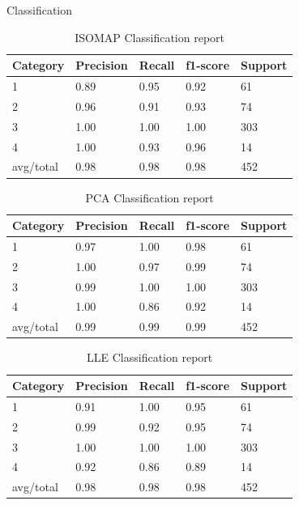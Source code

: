 \documentclass[final,hyperref={pdfpagelabels=false}]{beamer}
\begin{document}
\begin{frame}[t]
\begin{columns}[t]
\begin{column}{.465\textwidth}
\begin{block}{Classification}
\begin{table}
\begin{tabular}{l l l l l}
\toprule
\textbf{Category} & \textbf{Precision} & \textbf{Recall} & \textbf{f1-score} & \textbf{Support}\\
\midrule
1   &    0.89  &   0.95  &   0.92   &    61 \\
2   &    0.96  &   0.91	 &   0.93   &    74 \\
3   &    1.00  &   1.00	 &   1.00   &    303 \\
4   &    1.00  &   0.93	 &   0.96   &    14 \\
\midrule
avg/total   &    0.98  &   0.98 & 0.98 & 452 \\
\bottomrule
\end{tabular}
\caption{ISOMAP Classification report}
\end{table}

\begin{table}
\begin{tabular}{l l l l l}
\toprule
\textbf{Category} & \textbf{Precision} & \textbf{Recall} & \textbf{f1-score} & \textbf{Support}\\
\midrule
        1 &	0.97  &	   1.00	 &    0.98  &	   61\\ 
	2 &	1.00  &	   0.97	 &    0.99  &	   74\\ 
	3 &	0.99  &	   1.00	 &    1.00  &	  303\\ 
	4 &	1.00  &	   0.86	 &    0.92  &	   14\\ 
\midrule
avg/total & 0.99 &     0.99  &    0.99  &     452 \\
\bottomrule
\end{tabular}
\caption{PCA Classification report}
\end{table}

\begin{table}
\begin{tabular}{l l l l l}
\toprule
\textbf{Category} & \textbf{Precision} & \textbf{Recall} & \textbf{f1-score} & \textbf{Support}\\
\midrule
        1  &	0.91  &	   1.00	 &    0.95  &	   61\\ 
	2  &	0.99  &	   0.92	 &    0.95  &	   74\\ 
	3  &	1.00  &	   1.00	 &    1.00  &	  303\\ 
	4  &	0.92  &	   0.86	 &    0.89  &	   14\\ 

\midrule
avg/total & 0.98  &    0.98  &    0.98   &    452 \\
\bottomrule
\end{tabular}
\caption{LLE Classification report}
\end{table}


\end{block}
\end{column}
\end{columns}
\end{frame}
\end{document}

